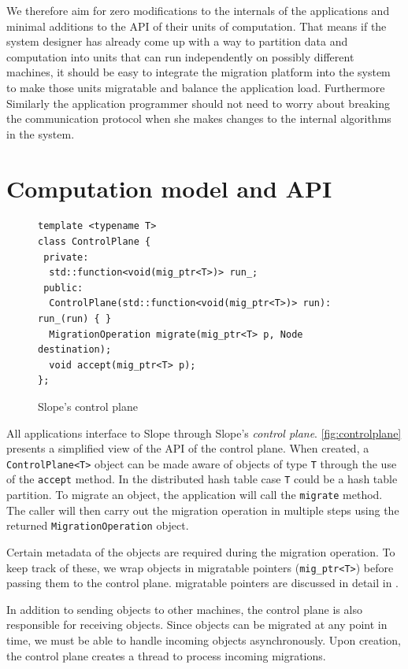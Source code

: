 We therefore aim for zero modifications to the
internals of the applications and minimal additions to the API of their
units of computation. That means if the system designer has already come up
with a way to partition data and computation into units that can run
independently on possibly different machines, it should be easy to
integrate the migration platform into the system to make those units
migratable and balance the application load. Furthermore Similarly the
application programmer should not need to worry about breaking the communication
protocol when she makes changes to the internal algorithms in the system.

\section{Computation model and API}
\label{sec:api}

\begin{figure}[t]
\begin{lstlisting}
template <typename T>
class ControlPlane {
 private:
  std::function<void(mig_ptr<T>)> run_;
 public:
  ControlPlane(std::function<void(mig_ptr<T>)> run): run_(run) { }
  MigrationOperation migrate(mig_ptr<T> p, Node destination);
  void accept(mig_ptr<T> p);
};
\end{lstlisting}
\caption{
    Slope's control plane
}
\label{fig:controlplane}
\end{figure}

All applications interface to Slope through Slope's \emph{control plane}.
\autoref{fig:controlplane} presents a simplified view of the API of the
control plane. When created, a \texttt{ControlPlane<T>} object can be
made aware of objects of type \texttt{T} through the use of the \texttt{accept}
method. In the distributed hash table case \texttt{T} could be a hash table
partition. To migrate an object, the application will call the \texttt{migrate}
method. The caller will then carry out the migration operation in multiple
steps using the returned \texttt{MigrationOperation} object.

Certain metadata of the objects are required during the migration
operation. To keep track of these, we wrap objects in
migratable pointers (\texttt{mig\_ptr<T>}) before passing them to the control
plane. migratable pointers are discussed in detail in .

In addition to sending objects to other machines, the control plane is also
responsible for receiving objects. Since objects can be migrated at any point
in time, we must be able to handle incoming objects asynchronously. Upon
creation, the control plane creates a thread to process incoming migrations.

